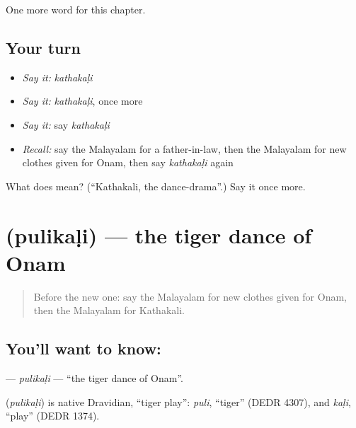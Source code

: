 \begin{grammarlens}[title={What you've built}]
One more word for this chapter.
\end{grammarlens}

\subsection*{Your turn}
\begin{itemize}
\raggedright
  \item \emph{Say it:} \emph{kathakaḷi}
  \item \emph{Say it:} \emph{kathakaḷi}, once more
  \item \emph{Say it:} say \emph{kathakaḷi}
  \item \emph{Recall:} say the Malayalam for a father-in-law, then the Malayalam for new clothes given for Onam, then say \emph{kathakaḷi} again
\end{itemize}

\begin{tcolorbox}[breakable,colback=teal!4,colframe=teal!35!black,title={Before you move on}]
What does  mean? (\textquotedblleft{}Kathakali, the dance-drama\textquotedblright{}.) Say it once more.
\end{tcolorbox}
\section[\texorpdfstring{\ml{പുലികളി} (pulikaḷi)}{പുലികളി (pulikaḷi)}]{ (pulikaḷi) — the tiger dance of Onam}

\label{lesson:ML-C290-pulikali}



\begin{quote}
Before the new one: say the Malayalam for new clothes given for Onam, then the Malayalam for Kathakali.
\end{quote}

\subsection*{You'll want to know: }
\textbf{} — \emph{pulikaḷi} — \textquotedblleft{}the tiger dance of Onam\textquotedblright{}.

\begin{cousinweb}
\textbf{} (\emph{pulikaḷi}) is native Dravidian, \textquotedblleft{}tiger play\textquotedblright{}: \emph{puli}, \textquotedblleft{}tiger\textquotedblright{} (DEDR 4307), and \emph{kaḷi}, \textquotedblleft{}play\textquotedblright{} (DEDR 1374).
\end{cousinweb}

